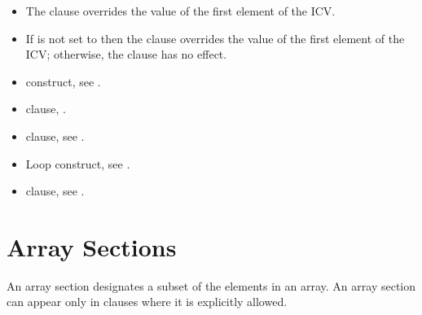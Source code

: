 \linenumbers

\descr
\begin{itemize}
\item The  clause overrides the value of the first element of the
 ICV.

\item If  is not set to  then the  clause overrides the value of the
first element of the  ICV; otherwise, the  clause has no effect.
\end{itemize}

\crossreferences
\begin{itemize}
\item {} construct, see
.

\item {} clause,
.

\item {} clause, see
.

\item Loop construct, see
.

\item {} clause, see
.
\end{itemize}










\section{Array Sections}
\label{sec:Array Sections}
An array section designates a subset of the elements in an array. An array section can
appear only in clauses where it is explicitly allowed.

